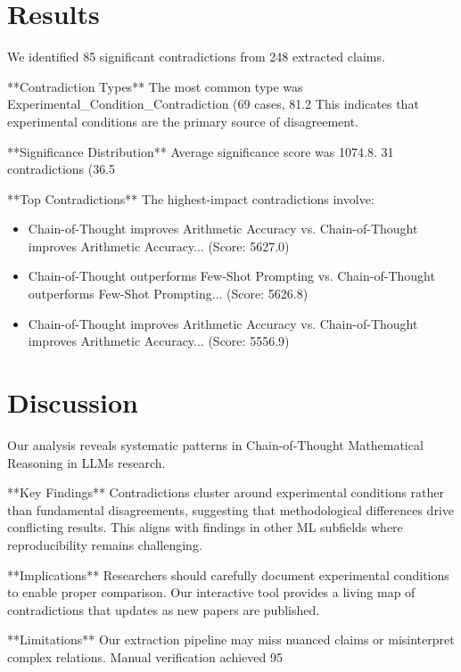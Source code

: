 \documentclass[11pt]{article}
\begin{document}
\section{Results}
We identified 85 significant contradictions from 248 extracted claims.

**Contradiction Types** The most common type was Experimental_Condition_Contradiction (69 cases, 81.2%
This indicates that experimental conditions are the primary source of disagreement.

**Significance Distribution** Average significance score was 1074.8.
31 contradictions (36.5%

**Top Contradictions** The highest-impact contradictions involve:
\begin{itemize}
\item Chain-of-Thought improves Arithmetic Accuracy vs. Chain-of-Thought improves Arithmetic Accuracy... (Score: 5627.0)
\end{itemize}
\begin{itemize}
\item Chain-of-Thought outperforms Few-Shot Prompting vs. Chain-of-Thought outperforms Few-Shot Prompting... (Score: 5626.8)
\end{itemize}
\begin{itemize}
\item Chain-of-Thought improves Arithmetic Accuracy vs. Chain-of-Thought improves Arithmetic Accuracy... (Score: 5556.9)
\end{itemize}


\section{Discussion}
Our analysis reveals systematic patterns in Chain-of-Thought Mathematical Reasoning in LLMs research.

**Key Findings** Contradictions cluster around experimental conditions rather than fundamental disagreements,
suggesting that methodological differences drive conflicting results.
This aligns with findings in other ML subfields where reproducibility remains challenging.

**Implications** Researchers should carefully document experimental conditions to enable proper comparison.
Our interactive tool provides a living map of contradictions that updates as new papers are published.

**Limitations** Our extraction pipeline may miss nuanced claims or misinterpret complex relations.
Manual verification achieved 95%
\end{document}
